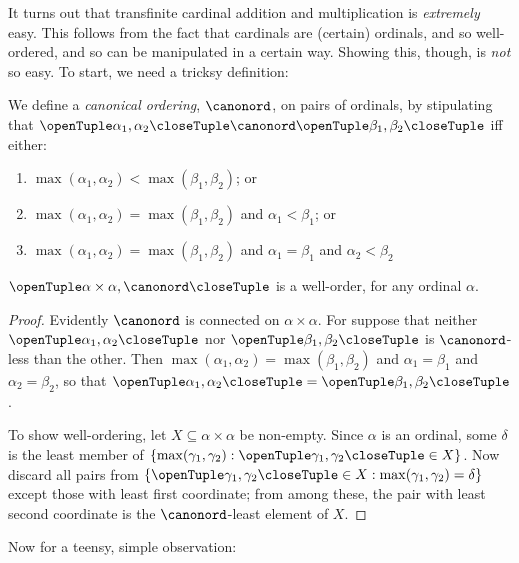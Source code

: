 \documentclass[../../../include/open-logic-section]{subfiles}
\begin{document}


It turns out that transfinite cardinal addition and multiplication is
\emph{extremely} easy. This follows from the fact that cardinals are
(certain) ordinals, and so well-ordered, and so can be manipulated in
a certain way. Showing this, though, is \emph{not} so easy. To start,
we need a tricksy definition:

\begin{defn}
We define a \emph{canonical ordering}, $\canonord$, on pairs of
ordinals, by stipulating that $\tuple{\alpha_1, \alpha_2} \canonord
\tuple{\beta_1, \beta_2}$ iff either:
\begin{enumerate}
	\item $\max(\alpha_1, \alpha_2) < \max(\beta_1, \beta_2)$; or
	\item $\max(\alpha_1, \alpha_2) = \max(\beta_1, \beta_2)$ and
	$\alpha_1 < \beta_1$; or
	\item $\max(\alpha_1, \alpha_2) = \max(\beta_1, \beta_2)$ and
	$\alpha_1 = \beta_1$ and $\alpha_2 < \beta_2$
\end{enumerate}
\end{defn}

\begin{lem}
$\tuple{\alpha \times \alpha, \canonord}$ is a well-order, for any
ordinal $\alpha$.
\end{lem}

\begin{proof}
Evidently $\canonord$ is connected on $\alpha \times \alpha$. For
suppose that neither $\tuple{\alpha_1, \alpha_2}$ nor $\tuple{\beta_1,
\beta_2}$ is $\canonord$-less than the other. Then $\max(\alpha_1,
\alpha_2) = \max(\beta_1, \beta_2)$ and $\alpha_1 = \beta_1$ and
$\alpha_2 = \beta_2$, so that $\tuple{\alpha_1, \alpha_2} =
\tuple{\beta_1,  \beta_2}$.

To show well-ordering, let $X \subseteq \alpha\times\alpha$ be
non-empty. Since $\alpha$ is an ordinal, some $\delta$ is the least
member of $\Setabs{\max(\gamma_1, \gamma_2)}{\tuple{\gamma_1,
\gamma_2} \in X}$. Now discard all pairs from
$\Setabs{\tuple{\gamma_1,\gamma_2} \in X}{\max(\gamma_1, \gamma_2) =
\delta}$ except those with least first coordinate; from among these,
the pair with least second coordinate is the $\canonord$-least element
of $X$.
\end{proof}
\noindent
Now for a teensy, simple observation:
\end{document}
